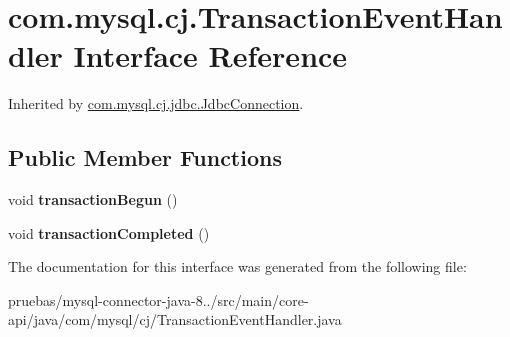 \hypertarget{interfacecom_1_1mysql_1_1cj_1_1_transaction_event_handler}{}\section{com.\+mysql.\+cj.\+Transaction\+Event\+Handler Interface Reference}
\label{interfacecom_1_1mysql_1_1cj_1_1_transaction_event_handler}


Inherited by \mbox{\hyperlink{interfacecom_1_1mysql_1_1cj_1_1jdbc_1_1_jdbc_connection}{com.\+mysql.\+cj.\+jdbc.\+Jdbc\+Connection}}.

\subsection*{Public Member Functions}
\begin{DoxyCompactItemize}
\item 
\mbox{\label{interfacecom_1_1mysql_1_1cj_1_1_transaction_event_handler_a4c745069ad52c307d91f62b3ebff5c01}} 
void {\bfseries transaction\+Begun} ()
\item 
\mbox{\label{interfacecom_1_1mysql_1_1cj_1_1_transaction_event_handler_ac0775d70699a27ec6a8a7954e64b86f8}} 
void {\bfseries transaction\+Completed} ()
\end{DoxyCompactItemize}


The documentation for this interface was generated from the following file\+:\begin{DoxyCompactItemize}
\item 
pruebas/mysql-\/connector-\/java-\/8../src/main/core-\/api/java/com/mysql/cj/Transaction\+Event\+Handler.\+java\end{DoxyCompactItemize}
